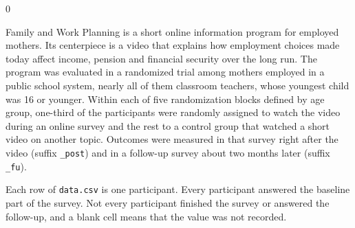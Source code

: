 \documentclass[10pt,border=0pt]{standalone}
\newlength{\promptwidth}
\newenvironment{promptbox}
  {\begin{lrbox}{0}\begin{minipage}{\dimexpr\promptwidth-2\fboxsep\relax}\small\setlength{\parskip}{0.5em}}
  {\end{minipage}\end{lrbox}\colorbox{promptbg}{\usebox{0}}}
\begin{document}
\begin{promptbox}
Family and Work Planning is a short online information program for employed mothers. Its centerpiece is a video that explains how employment choices made today affect income, pension and financial security over the long run. The program was evaluated in a randomized trial among mothers employed in a public school system, nearly all of them classroom teachers, whose youngest child was 16 or younger. Within each of five randomization blocks defined by age group, one-third of the participants were randomly assigned to watch the video during an online survey and the rest to a control group that watched a short video on another topic. Outcomes were measured in that survey right after the video (suffix \texttt{\_post}) and in a follow-up survey about two months later (suffix \texttt{\_fu}).

Each row of \texttt{data.csv} is one participant. Every participant answered the baseline part of the survey. Not every participant finished the survey or answered the follow-up, and a blank cell means that the value was not recorded.
\end{promptbox}
\end{document}
